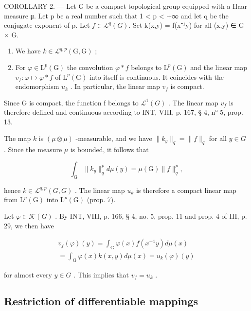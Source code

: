 COROLLARY 2. --- Let G be a compact topological group equipped with a Haar measure μ. Let p be a real number such that 1 \textless{} p \textless{} +∞ and let q be the conjugate exponent of p. Let \(f \in \mathcal{L}^{q}(G)\). Set k(x,y) = f(x⁻¹y) for all (x,y) ∈ G × G.

\begin{enumerate}
\def\labelenumi{\alph{enumi})}
\item
  We have \(k \in \mathcal{L}^{q,p}(\mathrm{G},\mathrm{G})\) ;
\item
  For \(\varphi \in \mathrm{L}^p (\mathrm{G})\) the convolution \(\varphi *f\) belongs to \(\mathrm{L}^p (\mathrm{G})\) and the linear map \(v_{f}\colon \varphi \mapsto \varphi *f\) of \(\mathrm{L}^p (\mathrm{G})\) into itself is continuous. It coincides with the endomorphism \(u_{k}\) . In particular, the linear map \(v_{f}\) is compact.
\end{enumerate}

Since G is compact, the function f belongs to \(\mathcal{L}^{1}(G)\) . The linear map \(v_{f}\) is therefore defined and continuous according to INT, VIII, p. 167, § 4, n° 5, prop. 13.

The map \(k\) is \((\mu \otimes \mu)\) -measurable, and we have \(\| k_y\| _q = \| f\| _q\) for all \(y\in G\) . Since the measure \(\mu\) is bounded, it follows that

\[
\int_ {\mathrm{G}} \| k _ {y} \| _ {q} ^ {p} d \mu (y) = \mu (\mathrm{G}) \| f \| _ {q} ^ {p},
\]

hence \(k \in \mathcal{L}^{q,p}(G, G)\) . The linear map \(u_{k}\) is therefore a compact linear map from \(\mathrm{L}^{p}(\mathrm{G})\) into \(\mathrm{L}^{p}(\mathrm{G})\) (prop. 7).

Let \(\varphi\in\mathcal{K}(G)\) . By INT, VIII, p. 166, § 4, no. 5, prop. 11 and prop. 4 of III, p. 29, we then have

\[
\begin{array}{c} v _ {f} (\varphi) (y) = \int_ {\mathrm{G}} \varphi (x) f (x ^ {- 1} y) d \mu (x) \\ = \int_ {\mathrm{G}} \varphi (x) k (x, y) d \mu (x) = u _ {k} (\varphi) (y) \end{array}
\]

for almost every \(y \in G\) . This implies that \(v_{f} = u_{k}\) .

\subsection{Restriction of differentiable mappings}

